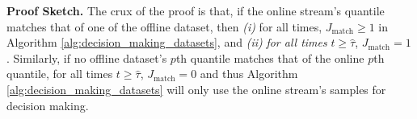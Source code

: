 \textbf{Proof Sketch.} The crux of the proof is that, if the online stream's quantile matches that of one of the offline dataset, then {\em(i)} for all times, $J_{\text{match}} \geq 1$ in Algorithm \ref{alg:decision_making_datasets}, and {\em(ii)} \emph{ for all times} $t \geq \widehat{\tau}$, $J_{\text{match}} = 1$. Similarly, if no offline dataset's $p$th quantile matches that of the online $p$th quantile, for all times $t \geq \widehat{\tau}$, $J_{\text{match}} = 0$ and thus Algorithm \ref{alg:decision_making_datasets} will only use the online stream's samples for decision making. 






